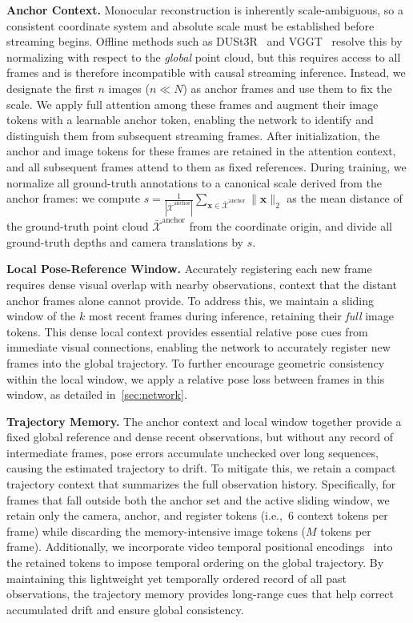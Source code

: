 \noindent\textbf{Anchor Context.}
Monocular reconstruction is inherently scale-ambiguous, so a consistent coordinate system and absolute scale must be established before streaming begins.
Offline methods such as DUSt3R~\cite{dust3r} and VGGT~\cite{wang2025vggt} resolve this by normalizing with respect to the \emph{global} point cloud, but this requires access to all frames and is therefore incompatible with causal streaming inference.
Instead, we designate the first $n$ images ($n \ll N$) as anchor frames and use them to fix the scale.
We apply full attention among these frames and augment their image tokens with a learnable anchor token, enabling the network to identify and distinguish them from subsequent streaming frames.
After initialization, the anchor and image tokens for these frames are retained in the attention context, and all subsequent frames attend to them as fixed references.
During training, we normalize all ground-truth annotations to a canonical scale derived from the anchor frames:
we compute $s = \frac{1}{|\bar{\mathcal{X}}^{\text{anchor}}|} \sum_{\mathbf{x}\in\bar{\mathcal{X}}^{\text{anchor}}} \lVert\mathbf{x}\rVert_2$ as the mean distance of the ground-truth point cloud $\bar{\mathcal{X}}^{\text{anchor}}$ from the coordinate origin, and divide all ground-truth depths and camera translations by $s$.

\noindent\textbf{Local Pose-Reference Window.}
Accurately registering each new frame requires dense visual overlap with nearby observations, context that the distant anchor frames alone cannot provide.
To address this, we maintain a sliding window of the $k$ most recent frames during inference, retaining their \emph{full} image tokens.
This dense local context provides essential relative pose cues from immediate visual connections, enabling the network to accurately register new frames into the global trajectory.
To further encourage geometric consistency within the local window, we apply a relative pose loss between frames in this window, as detailed in~\cref{sec:network}.

\noindent\textbf{Trajectory Memory.}
The anchor context and local window together provide a fixed global reference and dense recent observations, but without any record of intermediate frames, pose errors accumulate unchecked over long sequences, causing the estimated trajectory to drift.
To mitigate this, we retain a compact trajectory context that summarizes the full observation history.
Specifically, for frames that fall outside both the anchor set and the active sliding window, we retain only the camera, anchor, and register tokens (i.e.,~6 context tokens per frame) while discarding the memory-intensive image tokens ($M$ tokens per frame).
Additionally, we incorporate video temporal positional encodings~\cite{wan2025} into the retained tokens to impose temporal ordering on the global trajectory.
By maintaining this lightweight yet temporally ordered record of all past observations, the trajectory memory provides long-range cues that help correct accumulated drift and ensure global consistency.


